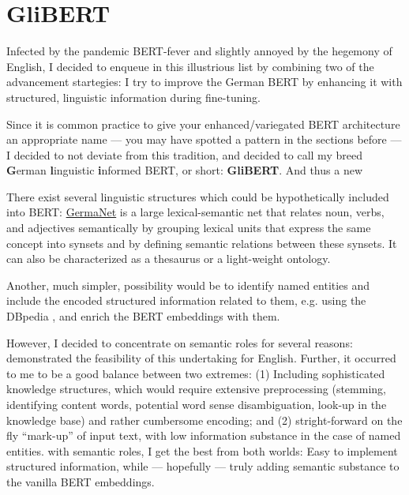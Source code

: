 \section{GliBERT}

Infected by the pandemic BERT-fever and slightly annoyed by the hegemony of English, I decided to
enqueue in this illustrious list by combining two of the {\color{red} advancement startegies}: I try to improve
the German BERT by enhancing it with structured, linguistic information during fine-tuning.

Since it is common practice to give your enhanced/variegated BERT architecture an appropriate name --- you may have spotted
a pattern in the sections before --- I decided to not deviate from this tradition, and decided to call my breed
\textbf{G}erman \textbf{l}inguistic \textbf{i}nformed BERT, or short: \textbf{GliBERT}.
And thus a new

There exist several linguistic structures which could be hypothetically included into BERT:
\href{https://uni-tuebingen.de/en/faculties/faculty-of-humanities/departments/modern-languages/department-of-linguistics/chairs/general-and-computational-linguistics/ressources/lexica/germanet/}{GermaNet} \citep{hamp1997germanet}
is a large lexical-semantic net that relates noun, verbs, and adjectives semantically by
grouping lexical units that express the same concept into synsets and by defining semantic
relations between these synsets. It can also be characterized as a thesaurus or a light-weight
ontology.

Another, much simpler, possibility would be to identify named entities
and include the encoded structured
information related to them, e.g. using the DBpedia \citep{auer2007dbpedia}, and enrich
the BERT embeddings with them.

However, I decided to concentrate on semantic roles for several reasons: \citeauthor{zhang2019semantics}
demonstrated the feasibility of this undertaking for English. Further, it occurred to me to be a good
balance between two extremes: (1) Including sophisticated knowledge structures, which would
require extensive preprocessing (stemming, identifying content words, potential word sense
disambiguation, look-up in the knowledge base) and rather cumbersome encoding; and (2)
stright-forward on the fly ``mark-up'' of input text, with low information substance in the
case of named entities. with semantic roles, I get the best from both worlds: Easy to implement
structured information, while --- hopefully --- truly adding semantic substance to the vanilla
BERT embeddings.



